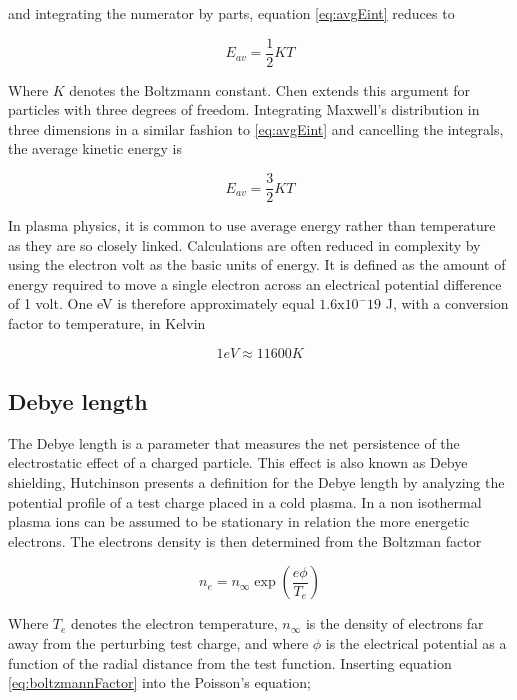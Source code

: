 and integrating the numerator by parts, equation \ref{eq:avgEint} reduces to

\begin{equation}\label{eq:avgE1D}
    E_{av} = \frac{1}{2} K T
\end{equation}

Where $K$ denotes the Boltzmann constant. Chen extends this argument for particles with three degrees of freedom. Integrating Maxwell's distribution in three dimensions in a similar fashion to \ref{eq:avgEint} and cancelling the integrals, the average kinetic energy is

\begin{equation}\label{eq:avgE3D}
    E_{av} = \frac{3}{2} K T
\end{equation}

In plasma physics, it is common to use average energy rather than temperature as they are so closely linked. Calculations are often reduced in complexity by using the electron volt as the basic units of energy. It is defined as the amount of energy required to move a single electron across an electrical potential difference of 1 volt. One eV is therefore approximately equal $1.6 \text{x} 10^-19$ J, with a conversion factor to temperature, in Kelvin

\begin{equation*}
    1 eV \approx 11600 K
\end{equation*}

\subsection{Debye length}
The Debye length is a parameter that measures the net persistence of the electrostatic effect of a charged particle. This effect is also known as Debye shielding, Hutchinson  presents a definition for the Debye length by analyzing the potential profile of a test charge placed in a cold plasma. In a non isothermal plasma ions can be assumed to be stationary in relation the more energetic electrons. The electrons density is then determined from the Boltzman factor

\begin{equation}\label{eq:boltzmannFactor}
    n_e = n_{\infty} \exp(\frac{e \phi}{T_e})
\end{equation}

Where $T_e$ denotes the electron temperature, $n_{\infty}$ is the density of electrons far away from the perturbing test charge, and where $\phi$ is the electrical potential as a function of the radial distance from the test function. Inserting equation \ref{eq:boltzmannFactor} into the Poisson's equation;

